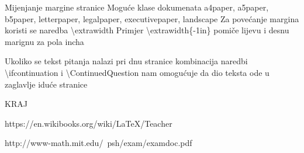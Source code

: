 \documentclass[addpoints,answers]{beamer}
\begin{document}
\begin{frame}{Mijenjanje margine stranice}
Moguće klase dokumenata \color{blue} a4paper, a5paper, b5paper, letterpaper, legalpaper, executivepaper, landscape\color{black}
\newline
Za povećanje margina koristi se naredba \color{blue} \textbackslash{extrawidth}
\color{black}
\newline
Primjer \color{blue}\textbackslash{extrawidth\{-1in\}} \color{black}
pomiče lijevu i desnu marignu za pola incha


\end{frame}

\begin{frame}
Ukoliko se tekst pitanja nalazi pri dnu stranice kombinacija naredbi \color{blue} \textbackslash{ifcontinuation} \color{black} i \color{blue} \textbackslash{ContinuedQuestion} \color{black}nam omogućuje da dio teksta ode u zaglavlje iduće stranice

\end{frame}

\begin{frame}
\begin{center}
     \color{red} {\huge KRAJ}
\end{center}

\end{frame}

	\begin{thebibliography}{2}
		
		 {https://en.wikibooks.org/wiki/LaTeX/Teacher}
		
		
		
		
		{http://www-math.mit.edu/~psh/exam/examdoc.pdf}
	\end{thebibliography}
\end{document}
